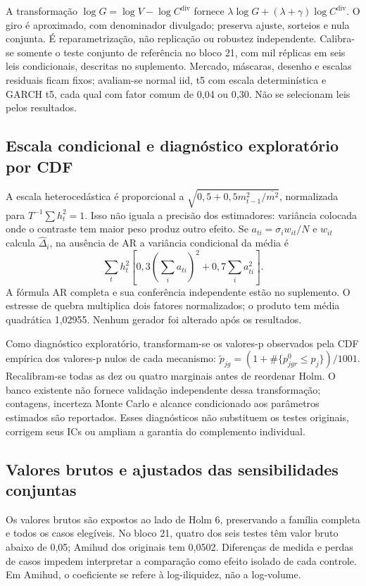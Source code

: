 \documentclass[12 pt]{article}
\begin{document}
A transformação $\log G=\log V-\log C^{\mathrm{div}}$ fornece
$\lambda\log G+(\lambda+\gamma)\log C^{\mathrm{div}}$.
O giro é aproximado, com denominador divulgado; preserva ajuste, sorteios
e nula conjunta. É reparametrização, não replicação ou robustez independente.
Calibra-se somente o teste conjunto de referência no bloco 21, com
mil réplicas em seis leis condicionais, descritas no suplemento.
Mercado, máscaras, desenho e escalas residuais ficam fixos; avaliam-se
normal iid, t5 com escala determinística e GARCH t5, cada qual com
fator comum de 0,04 ou 0,30. Não se selecionam leis pelos resultados.


\subsection{Escala condicional e diagnóstico exploratório por CDF}
A escala heterocedástica é proporcional a
$\sqrt{0,5+0,5m_{t-1}^2/\overline{m^2}}$, normalizada para
$T^{-1}\sum h_t^2=1$. Isso não iguala a precisão dos estimadores:
variância colocada onde o contraste tem maior peso produz outro efeito.
Se $a_{ti}=\sigma_iw_{it}/N $ e $w_{it}$ calcula $\widehat\Delta_i $,
na ausência de AR a variância condicional da média é
\begin{equation}
\sum_t h_t^2\left[0,3\left(\sum_i a_{ti}\right)^2+
0,7\sum_i a_{ti}^2\right].
\end{equation}
A fórmula AR completa e sua conferência independente estão no suplemento.
O estresse de quebra multiplica dois fatores normalizados; o produto
tem média quadrática 1,02955. Nenhum gerador foi alterado após os resultados.

Como diagnóstico exploratório, transformam-se os valores-p observados
pela CDF empírica dos valores-p nulos de cada mecanismo:
$\widetilde p_{jg}=(1+\#\{p^0_{jgr}\le p_j\})/1001$.
Recalibram-se todas as dez ou quatro marginais antes de reordenar Holm.
O banco existente não fornece validação independente dessa transformação;
contagens, incerteza Monte Carlo e alcance condicionado aos parâmetros
estimados são reportados. Esses diagnósticos não substituem os testes
originais, corrigem seus ICs ou ampliam a garantia do complemento individual.


\subsection{Valores brutos e ajustados das sensibilidades conjuntas}
Os valores brutos são expostos ao lado de Holm 6, preservando a família
completa e todos os casos elegíveis. No bloco 21, quatro dos seis testes
têm valor bruto abaixo de 0,05; Amihud dos originais tem 0,0502.
Diferenças de medida e perdas de casos impedem interpretar a comparação
como efeito isolado de cada controle. Em Amihud, o coeficiente se refere
à log-iliquidez, não a log-volume.
\begin{table}[htbp]\centering\small
\caption{Sensibilidades conjuntas: valores-p brutos e Holm 6, por bloco.
Famílias separadas entre comprimentos de bloco, sem proteção global.}

\end{table}
\end{document}
